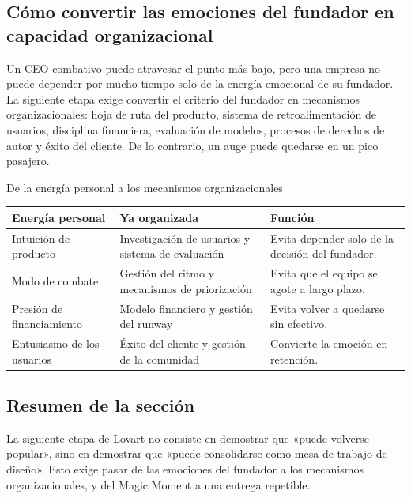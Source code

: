 \subsection{Cómo convertir las emociones del fundador en capacidad organizacional}

Un CEO combativo puede atravesar el punto más bajo, pero una empresa no puede depender por mucho tiempo solo de la energía emocional de su fundador. La siguiente etapa exige convertir el criterio del fundador en mecanismos organizacionales: hoja de ruta del producto, sistema de retroalimentación de usuarios, disciplina financiera, evaluación de modelos, procesos de derechos de autor y éxito del cliente. De lo contrario, un auge puede quedarse en un pico pasajero.

\begin{knowledgebox}{De la energía personal a los mecanismos organizacionales}
\begin{tabularx}{\textwidth}{p{}p{}X}
\toprule
Energía personal & Ya organizada & Función \\
\midrule
Intuición de producto & Investigación de usuarios y sistema de evaluación & Evita depender solo de la decisión del fundador. \\
Modo de combate & Gestión del ritmo y mecanismos de priorización & Evita que el equipo se agote a largo plazo. \\
Presión de financiamiento & Modelo financiero y gestión del runway & Evita volver a quedarse sin efectivo. \\
Entusiasmo de los usuarios & Éxito del cliente y gestión de la comunidad & Convierte la emoción en retención. \\
\bottomrule
\end{tabularx}
\end{knowledgebox}

\subsection{Resumen de la sección}

La siguiente etapa de Lovart no consiste en demostrar que «puede volverse popular», sino en demostrar que «puede consolidarse como mesa de trabajo de diseño». Esto exige pasar de las emociones del fundador a los mecanismos organizacionales, y del Magic Moment a una entrega repetible.
